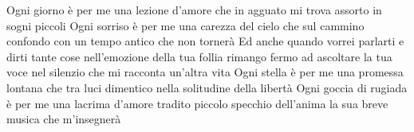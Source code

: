 \beginverse
Ogni giorno è per me
una lezione d'amore
che in agguato mi trova
assorto in sogni piccoli
Ogni sorriso è per me
una carezza del cielo
che sul cammino confondo
con un tempo antico che non tornerà
\endverse
\beginchorus
Ed anche quando vorrei parlarti e dirti tante cose
nell'emozione della tua follia
rimango fermo ad ascoltare
la tua voce nel silenzio
che mi racconta un'altra vita
\endchorus
\beginverse
Ogni stella è per me
una promessa lontana
che tra luci dimentico
nella solitudine della libertà
Ogni goccia di rugiada è per me
una lacrima d'amore tradito
piccolo specchio dell'anima
la sua breve musica che m'insegnerà
\endverse
\endsong
